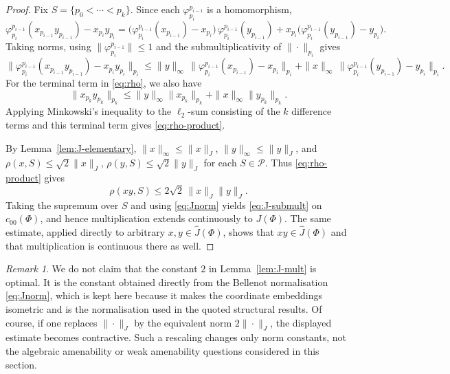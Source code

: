 \documentclass[reqno]{amsart}
\theoremstyle{plain}
\theoremstyle{definition}
\theoremstyle{remark}
\newtheorem{remark}[theorem]{Remark}
\renewcommand{\le}{\leqslant}
\begin{document}
\begin{proof}
Fix $S=\{p_0<\cdots<p_k\}$.  Since each $\varphi_{p_i}^{p_{i-1}}$ is a homomorphism,
\[
\varphi_{p_i}^{p_{i-1}}(x_{p_{i-1}}y_{p_{i-1}})-x_{p_i}y_{p_i}
=
\big(\varphi_{p_i}^{p_{i-1}}(x_{p_{i-1}})-x_{p_i}\big)\,\varphi_{p_i}^{p_{i-1}}(y_{p_{i-1}})
+
x_{p_i}\big(\varphi_{p_i}^{p_{i-1}}(y_{p_{i-1}})-y_{p_i}\big).
\]
Taking norms, using $\|\varphi_{p_i}^{p_{i-1}}\|\le 1$ and the submultiplicativity
of $\|\cdot\|_{p_i}$ gives
\[
\big\|\varphi_{p_i}^{p_{i-1}}(x_{p_{i-1}}y_{p_{i-1}})-x_{p_i}y_{p_i}\big\|_{p_i}
\le
\|y\|_{\infty}\,\big\|\varphi_{p_i}^{p_{i-1}}(x_{p_{i-1}})-x_{p_i}\big\|_{p_i}
+
\|x\|_{\infty}\,\big\|\varphi_{p_i}^{p_{i-1}}(y_{p_{i-1}})-y_{p_i}\big\|_{p_i}.
\]
For the terminal term in \eqref{eq:rho}, we also have
\[
\|x_{p_k}y_{p_k}\|_{p_k}
\le \|y\|_\infty\|x_{p_k}\|_{p_k}+\|x\|_\infty\|y_{p_k}\|_{p_k}.
\]
Applying Minkowski's inequality to the $\ell_2$-sum consisting of the $k$ difference terms and this terminal term gives
\eqref{eq:rho-product}.

By Lemma~\ref{lem:J-elementary}, $\|x\|_\infty\le\|x\|_J$, $\|y\|_\infty\le\|y\|_J$, and
$\rho(x,S)\le\sqrt2\|x\|_J$, $\rho(y,S)\le\sqrt2\|y\|_J$ for each $S\in\mathcal P$.
Thus \eqref{eq:rho-product} gives
\[
\rho(xy,S)\le 2\sqrt2\,\|x\|_J\|y\|_J.
\]
Taking the supremum over $S$ and using \eqref{eq:Jnorm} yields
\eqref{eq:J-submult} on $c_{00}(\Phi)$, and hence multiplication extends continuously to $J(\Phi)$.
The same estimate, applied directly to arbitrary $x,y\in\widehat{J}(\Phi)$, shows that
$xy\in\widehat{J}(\Phi)$ and that multiplication is continuous there as well.
\end{proof}

\begin{remark}\label{rem:J-mult-constant}
We do not claim that the constant $2$ in Lemma~\ref{lem:J-mult} is optimal.  It is the
constant obtained directly from the Bellenot normalisation \eqref{eq:Jnorm}, which is kept here
because it makes the coordinate embeddings isometric and is the normalisation used in the
quoted structural results.  Of course, if one replaces $\|\cdot\|_J$ by the equivalent norm
$2\|\cdot\|_J$, the displayed estimate becomes contractive.  Such a rescaling changes only
norm constants, not the algebraic amenability or weak amenability questions considered in this
section.
\end{remark}
\end{document}
